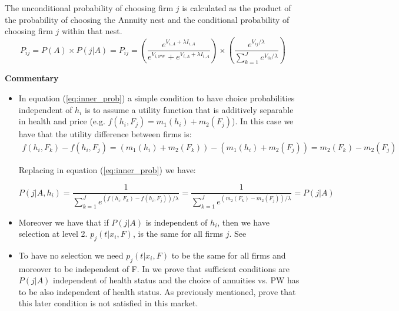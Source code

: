 \documentclass[12pt]{article}
\theoremstyle{plain}
\theoremstyle{plain}
\begin{document}
The unconditional probability of choosing firm $j$ is calculated as the product of the probability of choosing the Annuity nest and the conditional probability of choosing firm $j$ within that nest.
\begin{equation}
    P_{ij} = P(A) \times P(j|A) =
    P_{ij} = \left( \frac{e^{V_{i, A} + \lambda I_{i, A}}}{e^{V_{i, \text{PW}}} + e^{V_{i, A} + \lambda I_{i, A}}} \right) \times \left( \frac{e^{V_{ij} / \lambda}}{\sum_{k=1}^{J} e^{V_{ik} / \lambda}} \right)
\end{equation}

\textbf{Commentary}


\begin{itemize}
    \item In equation (\ref{eq:inner_prob}) a simple condition to have choice probabilities independent of $h_i$ is to assume a utility function that is additively separable in health and price (e.g. $f(h_i, F_j) = m_1(h_i) + m_2(F_j)$). In this case we have that the utility difference between firms is: 
    \begin{align*}
    f(h_i, F_k) - f(h_i, F_j) = ( m_1(h_i) + m_2(F_k)) - ( m_1(h_i) + m_2(F_j)) = m_2(F_k) - m_2(F_j)
    \end{align*}

    Replacing in equation (\ref{eq:inner_prob}) we have: 
    
    \begin{equation}\label{eq:inner_prob2}
    P(j|A, h_i) = \frac{1}{\sum_{k=1}^{J} e^{(f(h_i, F_k)-f(h_i, F_j)) / \lambda}} =  \frac{1}{\sum_{k=1}^{J} e^{(m_2(F_k) - m_2(F_j)) / \lambda}} = P(j|A)
    \end{equation}


    \item Moreover we have that if $P(j|A)$ is independent of $h_i$, then we have selection at level 2. $p_j(t|x_i, F)$, is the same for all firms $j$. See 

    \item To have no selection we need $p_j(t|x_i, F)$ to be the same for all firms and moreover to be independent of F. In  we prove that sufficient conditions are  $P(j|A)$ independent of health status and the choice of annuities vs. PW has to be also independent of health status. As previously mentioned, \textcite{illanes_retirement_2019} prove that this later condition is not satisfied in this market. 
\end{itemize}


\newpage 
\end{document}
